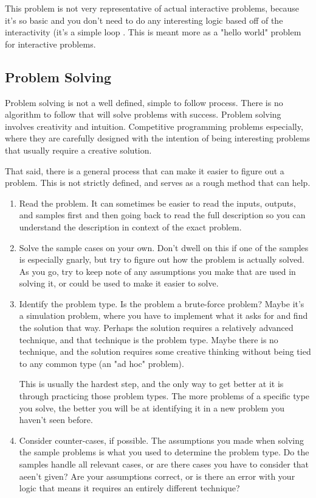 This problem is not very representative of actual interactive problems, because it's so basic and you don't need to do any interesting logic based off of the interactivity (it's a simple loop . This is meant more as a "hello world" problem for interactive problems.

\subsection{Problem Solving}

Problem solving is not a well defined, simple to follow process. There is no algorithm to follow that will solve problems with success. Problem solving involves creativity and intuition. Competitive programming problems especially, where they are carefully designed with the intention of being interesting problems that usually require a creative solution.

That said, there is a general process that can make it easier to figure out a problem. This is not strictly defined, and serves as a rough method that can help.

\begin{enumerate}
\item Read the problem. It can sometimes be easier to read the inputs, outputs, and samples first and then going back to read the full description so you can understand the description in context of the exact problem.
\item Solve the sample cases on your own. Don't dwell on this if one of the samples is especially gnarly, but try to figure out how the problem is actually solved. As you go, try to keep note of any assumptions you make that are used in solving it, or could be used to make it easier to solve.
\item Identify the problem type. Is the problem a brute-force problem? Maybe it's a simulation problem, where you have to implement what it asks for and find the solution that way. Perhaps the solution requires a relatively advanced technique, and that technique is the problem type. Maybe there is no technique, and the solution requires some creative thinking without being tied to any common type (an "ad hoc" problem).

This is usually the hardest step, and the only way to get better at it is through practicing those problem types. The more problems of a specific type you solve, the better you will be at identifying it in a new problem you haven't seen before.
\item Consider counter-cases, if possible. The assumptions you made when solving the sample problems is what you used to determine the problem type. Do the samples handle all relevant cases, or are there cases you have to consider that aeen't given? Are your assumptions correct, or is there an error with your logic that means it requires an entirely different technique?
\end{enumerate}

